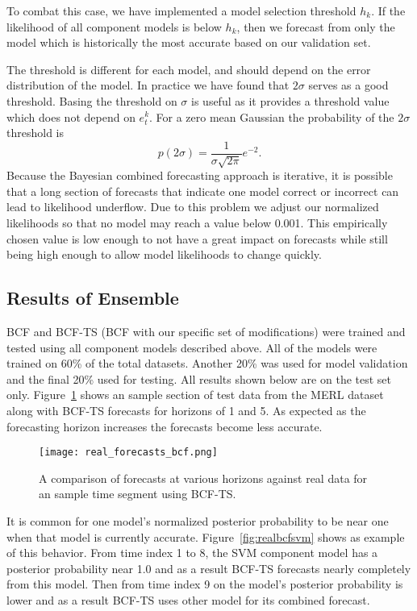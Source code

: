 To combat this case, we have implemented a model selection threshold $h_{k}$.  If the likelihood of all component models is below $h_{k}$, then we forecast from only the model which is historically the most accurate based on our validation set.  

The threshold is different for each model, and should depend on the error distribution of the model.  In practice we have found that $2\sigma$ serves as a good threshold.  Basing the threshold on $\sigma$ is useful as it provides a threshold value which does not depend on $e^{k}_{t}$.  For a zero mean Gaussian the probability of the $2\sigma$ threshold is
\begin{equation}
p(2\sigma) = \frac{1}{\sigma\sqrt{2\pi}}e^{-2}.
\end{equation}
Because the Bayesian combined forecasting approach is iterative, it is possible that a long section of forecasts that indicate one model correct or incorrect can lead to likelihood underflow.  Due to this problem we adjust our normalized likelihoods so that no model may reach a value below 0.001.  This empirically chosen value is low enough to not have a great impact on forecasts while still being high enough to allow model likelihoods to change quickly.

\subsection{Results of Ensemble}

BCF and BCF-TS (BCF with our specific set of modifications) were trained and tested using all component models described above.  All of the models were trained on 60\% of the total datasets.  Another 20\% was used for model validation and the final 20\% used for testing.  All results shown below are on the test set only.  Figure~\ref{fig:realbcf} shows an sample section of test data from the MERL dataset along with BCF-TS forecasts for horizons of 1 and 5.   As expected as the forecasting horizon increases the forecasts become less accurate.

\begin{figure}[h]
\centering
\texttt{[image: real\_forecasts\_bcf.png]}
\caption{A comparison of forecasts at various horizons against real data for an sample time segment using BCF-TS.}
\label{fig:realbcf}
\end{figure}

It is common for one model's normalized posterior probability to be near one when that model is currently accurate.  Figure~\ref{fig:realbcfsvm} shows as example of this behavior.  From time index 1 to 8, the SVM component model has a posterior probability near 1.0 and as a result BCF-TS forecasts nearly completely from this model.  Then from time index 9 on the model's posterior probability is lower and as a result BCF-TS uses other model for its combined forecast.

